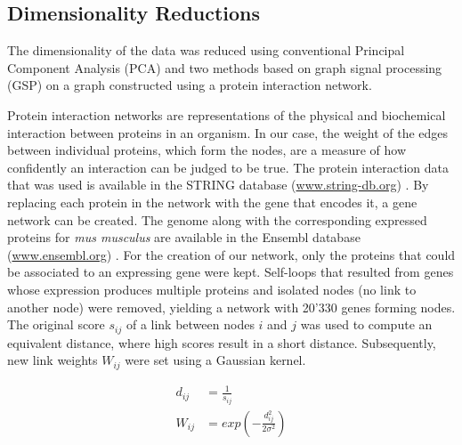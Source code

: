 \documentclass[10pt,conference,compsocconf]{IEEEtran}
\begin{document}
\subsection{Dimensionality Reductions}
The dimensionality of the data was reduced using conventional Principal Component Analysis (PCA) and two methods based on graph signal processing (GSP) on a graph constructed using a protein interaction network.
\par
Protein interaction networks are representations of the physical and biochemical interaction between proteins in an organism. In our case, the weight of the edges between individual proteins, which form the nodes, are a measure of how confidently an interaction can be judged to be true. The protein interaction data that was used is available in the STRING database (\url{www.string-db.org}) \cite{Szklarczyk2016}. By replacing each protein in the network with the gene that encodes it, a gene network can be created. The genome along with the corresponding expressed proteins for \textit{mus musculus} are available in the Ensembl database (\url{www.ensembl.org}) \cite{Zerbino2017}. For the creation of our network, only the proteins that could be associated to an expressing gene were kept. Self-loops that resulted from genes whose expression produces multiple proteins and isolated nodes (no link to another node) were removed, yielding a network with 20'330 genes forming nodes. The original score $s_{ij}$ of a link between nodes $i$ and $j$ was used to compute an equivalent distance, where high scores result in a short distance. Subsequently, new link weights $W_{ij}$ were set using a Gaussian kernel.

\begin{align}
d_{ij} &= \frac{1}{s_{ij}} \\
W_{ij} &= exp (- \frac{d_{ij}^2}{2 \sigma^2})
\end{align}
\par
\end{document}
